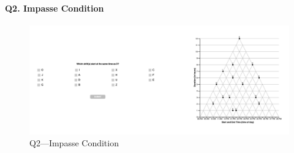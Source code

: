 \documentclass[
  letterpaper,
  DIV=11,
  numbers=noendperiod]{scrreprt}
\let\oldparagraph\paragraph
\renewcommand{\paragraph}[1]{\oldparagraph{#1}\mbox{}}
\begin{document}
\hypertarget{q2.-impasse-condition}{%
\paragraph{Q2. Impasse Condition}\label{q2.-impasse-condition}}

\begin{figure}

{\centering \includegraphics{analysis/SGC3A/static/questions/Q2_121.png}

}

\caption{\label{fig-Q2-121}Q2---Impasse Condition}

\end{figure}
\end{document}
